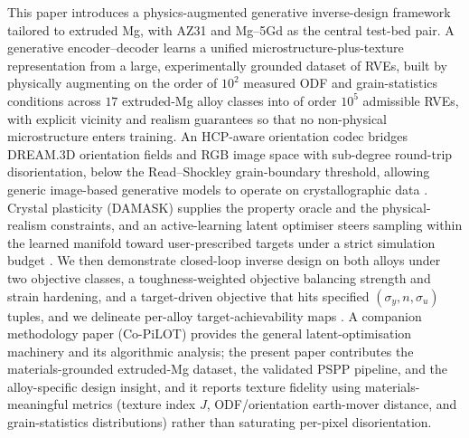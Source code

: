 \documentclass[preprint,12pt]{elsarticle}
\begin{document}
This paper introduces a physics-augmented generative inverse-design framework tailored to extruded Mg, with AZ31 and Mg--5Gd as the central test-bed pair. A generative encoder--decoder learns a unified microstructure-plus-texture representation from a large, experimentally grounded dataset of RVEs, built by physically augmenting on the order of $10^2$ measured ODF and grain-statistics conditions across $17$ extruded-Mg alloy classes into of order $10^5$ admissible RVEs, with explicit vicinity and realism guarantees so that no non-physical microstructure enters training. An HCP-aware orientation codec bridges DREAM.3D orientation fields and RGB image space with sub-degree round-trip disorientation, below the Read--Shockley grain-boundary threshold, allowing generic image-based generative models to operate on crystallographic data \cite{groeber2014,readshockley1950}. Crystal plasticity (DAMASK) supplies the property oracle and the physical-realism constraints, and an active-learning latent optimiser steers sampling within the learned manifold toward user-prescribed targets under a strict simulation budget \cite{Roters-DAMASK-2019,CoPiLOT2026}. We then demonstrate closed-loop inverse design on both alloys under two objective classes, a toughness-weighted objective balancing strength and strain hardening, and a target-driven objective that hits specified $(\sigma_y, n, \sigma_u)$ tuples, and we delineate per-alloy target-achievability maps {\color{red}\cite{CoPiLOT2026}}. A companion methodology paper (Co-PiLOT) provides the general latent-optimisation machinery and its algorithmic analysis; the present paper contributes the materials-grounded extruded-Mg dataset, the validated PSPP pipeline, and the alloy-specific design insight, and it reports texture fidelity using materials-meaningful metrics (texture index $J$, ODF/orientation earth-mover distance, and grain-statistics distributions) rather than saturating per-pixel disorientation.
\end{document}
